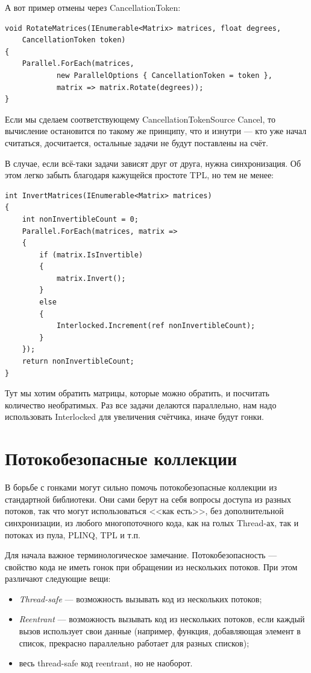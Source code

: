 \documentclass[a5paper]{article}
\begin{document}
А вот пример отмены через CancellationToken:

\begin{verbatim}
void RotateMatrices(IEnumerable<Matrix> matrices, float degrees,
    CancellationToken token)
{
    Parallel.ForEach(matrices,
            new ParallelOptions { CancellationToken = token },
            matrix => matrix.Rotate(degrees));
}
\end{verbatim}

Если мы сделаем соответствующему CancellationTokenSource Cancel, то вычисление остановится по такому же принципу, что и изнутри --- кто уже начал считаться, досчитается, остальные задачи не будут поставлены на счёт.

В случае, если всё-таки задачи зависят друг от друга, нужна синхронизация. Об этом легко забыть благодаря кажущейся простоте TPL, но тем не менее:

\begin{verbatim}
int InvertMatrices(IEnumerable<Matrix> matrices)
{
    int nonInvertibleCount = 0;
    Parallel.ForEach(matrices, matrix =>
    {
        if (matrix.IsInvertible) 
        {
            matrix.Invert();
        } 
        else 
        {
            Interlocked.Increment(ref nonInvertibleCount);
        }
    });
    return nonInvertibleCount;
}
\end{verbatim}

Тут мы хотим обратить матрицы, которые можно обратить, и посчитать количество необратимых. Раз все задачи делаются параллельно, нам надо использовать Interlocked для увеличения счётчика, иначе будут гонки.

\section{Потокобезопасные коллекции}

В борьбе с гонками могут сильно помочь потокобезопасные коллекции из стандартной библиотеки. Они сами берут на себя вопросы доступа из разных потоков, так что могут использоваться <<как есть>>, без дополнительной синхронизации, из любого многопоточного кода, как на голых Thread-ах, так и потоках из пула, PLINQ, TPL и т.п. 

Для начала важное терминологическое замечание. Потокобезопасность --- свойство кода не иметь гонок при обращении из нескольких потоков. При этом различают следующие вещи:
\begin{itemize}
    \item \textit{Thread-safe} --- возможность вызывать код из нескольких потоков;
    \item \textit{Reentrant} --- возможность вызывать код из нескольких потоков, если каждый вызов использует свои данные (например, функция, добавляющая элемент в список, прекрасно параллельно работает для разных списков);
    \item весь thread-safe код reentrant, но не наоборот.
\end{itemize}
\end{document}
